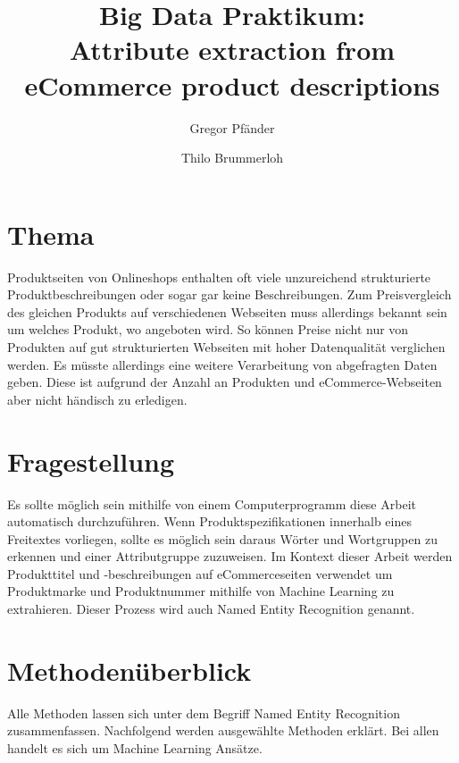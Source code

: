 \documentclass[paper=a4,12pt,listof=totoc]{scrartcl}%
\title{Big Data Praktikum: \\ Attribute extraction from eCommerce product descriptions}
\author{Gregor Pfänder 
\and Thilo Brummerloh}
\begin{document}
	\maketitle
	\section{Thema}
	Produktseiten von Onlineshops enthalten oft viele unzureichend strukturierte Produktbeschreibungen oder sogar gar keine Beschreibungen. Zum Preisvergleich des gleichen Produkts auf verschiedenen Webseiten muss allerdings bekannt sein um welches Produkt, wo angeboten wird. So können Preise nicht nur von Produkten auf gut strukturierten Webseiten mit hoher Datenqualität verglichen werden. Es müsste allerdings eine weitere Verarbeitung von abgefragten Daten geben. Diese ist aufgrund der Anzahl an Produkten und eCommerce-Webseiten aber nicht händisch zu erledigen.
	
	\section{Fragestellung}
	Es sollte möglich sein mithilfe von einem Computerprogramm diese Arbeit automatisch durchzuführen. Wenn Produktspezifikationen innerhalb eines Freitextes vorliegen, sollte es möglich sein daraus Wörter und Wortgruppen zu erkennen und einer Attributgruppe zuzuweisen.
	Im Kontext dieser Arbeit werden Produkttitel und -beschreibungen auf eCommerceseiten verwendet um Produktmarke und Produktnummer mithilfe von Machine Learning zu extrahieren. Dieser Prozess wird auch Named Entity Recognition genannt.
	
	\section{Methodenüberblick}
	Alle Methoden lassen sich unter dem Begriff Named Entity Recognition zusammenfassen.	Nachfolgend werden ausgewählte Methoden erklärt. Bei allen handelt es sich um Machine Learning Ansätze. 
	
\end{document}
